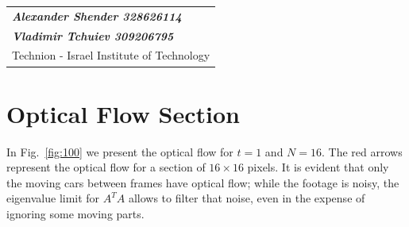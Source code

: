 \documentclass[a4paper]{iacas}
\begin{document}
\begin{tabular}{l}
\\
{\bf\textit{Alexander Shender 328626114}} \\
{\bf\textit{Vladimir Tchuiev 309206795}} \\
Technion - Israel Institute of Technology
\end{tabular}

\vspace{2em}

\section{Optical Flow Section}

In Fig.~\ref{fig:100} we present the optical flow for $t=1$ and $N=16$. The red arrows represent the optical flow for a section of $16 \times 16$ pixels. It is evident that only the moving cars between frames have optical flow; while the footage is noisy, the eigenvalue limit for $A^T A$ allows to filter that noise, even in the expense of ignoring some moving parts.
\end{document}
